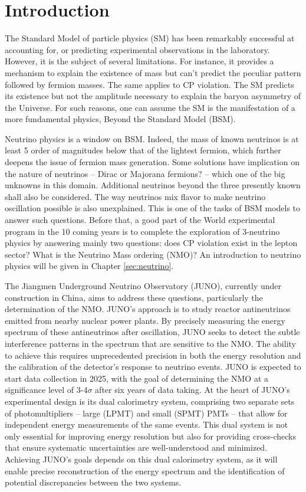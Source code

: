 \documentclass[../main.tex]{subfiles}
\begin{document}
\chapter*{Introduction}

The Standard Model of particle physics (SM) has been remarkably successful at accounting for, or predicting experimental observations in the laboratory.
However, it is the subject of several limitations. For instance, it provides a mechanism to explain the existence of mass but can't predict the peculiar pattern followed by fermion masses.
The same applies to CP violation. The SM predicts its existence but not the amplitude necessary to explain the baryon asymmetry of the Universe. For such reasons, one can assume the SM is the manifestation of a more fundamental physics, Beyond the Standard Model (BSM).

Neutrino physics is a window on BSM. Indeed, the mass of known neutrinos is at least 5 order of magnitudes below that of the lightest fermion, which further deepens
the issue of fermion mass generation.
Some solutions have implication on the nature of neutrinos -- Dirac or Majorana fermions?  --  which one of the big unknowns in this domain. Additional neutrinos beyond the three presently known shall also be considered. The way neutrinos mix flavor to make neutrino oscillation possible is also unexplained.
This is one of the tasks of BSM models to answer such questions. Before that, a good part of the World experimental program in the 10 coming years is to complete the exploration of 3-neutrino physics by answering mainly two questions:
does CP violation exist in the lepton sector? What is the Neutrino Mass ordering (NMO)?
An introduction to neutrino physics will be given in Chapter \ref{sec:neutrino}.

\hfill

The Jiangmen Underground Neutrino Observatory (JUNO), currently under construction in China, aims to address these questions, particularly the determination of the NMO. JUNO's approach is to study reactor antineutrinos emitted from nearby nuclear power plants. By precisely measuring the energy spectrum of these antineutrinos after oscillation, JUNO seeks to detect the subtle interference patterns in the spectrum that are sensitive to the NMO. The ability to achieve this requires unprecedented precision in both the energy resolution and the calibration of the detector's response to neutrino events. JUNO is expected to start data collection in 2025, with the goal of determining the NMO at a significance level of 3-4$\sigma$ after six years of data taking.
At the heart of JUNO's experimental design is its dual calorimetry system, comprising two separate sets of photomultipliers -- large (LPMT) and small (SPMT) PMTs -- that allow for independent energy measurements of the same events. This dual system is not only essential for improving energy resolution but also for providing cross-checks that ensure systematic uncertainties are well-understood and minimized. Achieving JUNO's goals depends on this dual calorimetry system, as it will enable precise reconstruction of the energy spectrum and the identification of potential discrepancies between the two systems.
\end{document}
